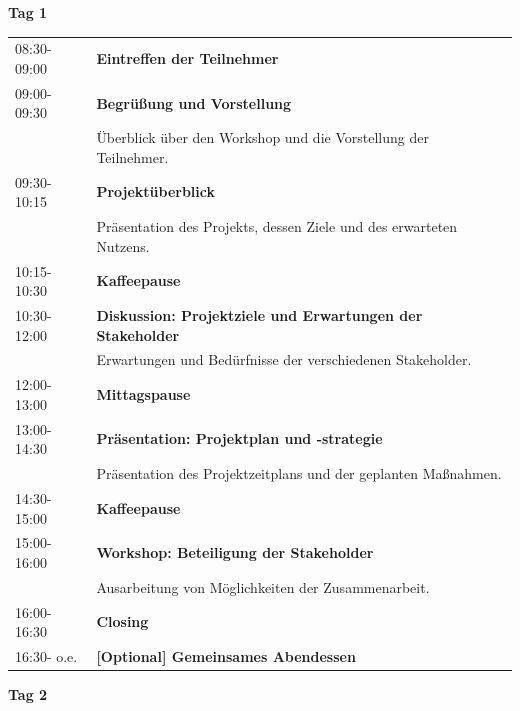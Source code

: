\clearpage
\begin{center}
	\Large{\textbf{Tag 1}}
\end{center}

\noindent
\begin{tabularx}{\textwidth}{@{}lX@{}}
	08:30-09:00 & \textbf{Eintreffen der Teilnehmer}\\
	09:00-09:30 & \textbf{Begrüßung und Vorstellung}\\
	& Überblick über den Workshop und die Vorstellung der Teilnehmer.\\
	09:30-10:15 & \textbf{Projektüberblick}\\
	& Präsentation des Projekts, dessen Ziele und des erwarteten Nutzens.\\
	10:15-10:30 & \textbf{Kaffeepause}\\
	10:30-12:00 & \textbf{Diskussion: Projektziele und Erwartungen der Stakeholder}\\
	& Erwartungen und Bedürfnisse der verschiedenen Stakeholder.\\
	12:00-13:00 & \textbf{Mittagspause}\\
	13:00-14:30 & \textbf{Präsentation: Projektplan und -strategie}\\
	& Präsentation des Projektzeitplans und der geplanten Maßnahmen.\\
	14:30-15:00 & \textbf{Kaffeepause}\\
	15:00-16:00 & \textbf{Workshop: Beteiligung der Stakeholder}\\
	& Ausarbeitung von Möglichkeiten der Zusammenarbeit.\\
	16:00-16:30 & \textbf{Closing}\\
	16:30- o.e. & \textbf{[Optional] Gemeinsames Abendessen}
\end{tabularx}


\begin{center}
	\Large{\textbf{Tag 2}}
\end{center}

